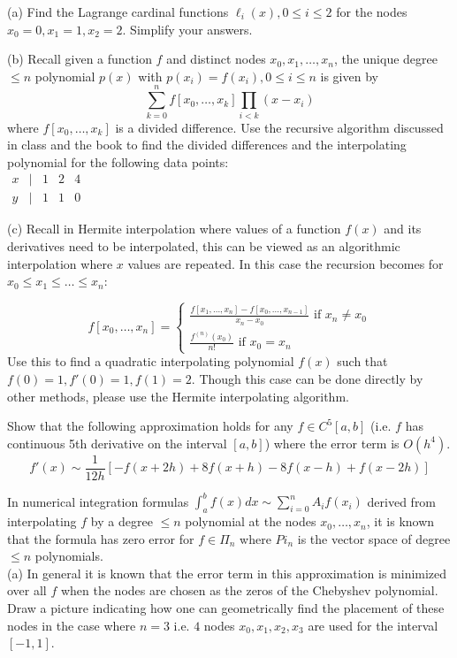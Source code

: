 \documentclass[12pt]{article}
\begin{document}
\newpage

(a) Find the Lagrange cardinal functions $\ell_i(x), 0 \leq i \leq 2$ for the nodes $x_0=0, x_1=1, x_2=2$. 
Simplify your answers. 

\vspace{2 in}

\noindent
(b) Recall given a function $f$ and distinct nodes $x_0, x_1, \dots, x_n$, the unique degree $\leq n$ polynomial $p(x)$ with $p(x_i)=f(x_i), 0 \leq i \leq n$ 
is given by 
$$
\sum_{k=0}^n f[x_0,\dots,x_k] \prod_{i < k} (x-x_i)
$$
where $f[x_0,\dots,x_k]$ is a divided difference. Use the recursive algorithm discussed in class and the book to find the divided differences and 
the interpolating polynomial for the following data points: \\
$\begin{matrix} x & | & 1 & 2 & 4 
\\  y & | & 1 & 1 & 0
\end{matrix}$

\newpage

\noindent
(c) Recall in Hermite interpolation where values of a function $f(x)$ and its derivatives need to be interpolated, this can be viewed as an algorithmic interpolation  where $x$ values are repeated. In this case the recursion becomes
for $x_0 \leq x_1 \leq \dots \leq x_n$:

$$
f[x_0, \dots, x_n] = \begin{cases} \frac{f[x_1,\dots,x_n] - f[x_0, \dots, x_{n-1}]}{x_n-x_0} \text{ if } x_n \neq x_0 \\
\frac{f^{(n)}(x_0)}{n!} \text{ if } x_0=x_n
\end{cases}
$$
Use this to find a quadratic interpolating polynomial $f(x)$ such that \\
$f(0)=1, f'(0)=1, f(1)=2$. Though this case can be done directly by other methods, please use the Hermite interpolating algorithm.

\vspace{3in}

Show that the following approximation holds for any $f \in C^5[a,b]$ (i.e. $f$ has continuous 5th derivative on the interval $[a,b]$) where the error term is $O(h^4)$.
$$
f'(x) \sim \frac{1}{12h}[-f(x+2h)+8f(x+h)-8f(x-h)+f(x-2h)] 
$$

\newpage

In numerical integration formulas $\int_a^b f(x) dx \sim \sum_{i=0}^n A_i f(x_i)$ derived from interpolating $f$ by a degree $\leq n$ polynomial at 
the nodes $x_0, \dots, x_n$, it is known that the formula has zero error for $f \in \Pi_n$ where $Pi_n$ is the vector space of degree $\leq n$ polynomials. \\
(a) In general it is known that the error term in this approximation is minimized over all $f$ when the nodes are chosen as the zeros of the Chebyshev polynomial.
Draw a picture indicating how one can geometrically find the placement of these nodes in the case where $n=3$ i.e. $4$ nodes $x_0, x_1, x_2, x_3$ are used 
for the interval $[-1,1]$.
\end{document}
